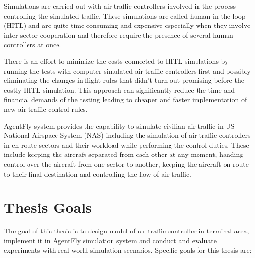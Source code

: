 Simulations are carried out with air traffic controllers involved in the process controlling the simulated traffic. These simulations are called human in the loop (HITL) and are quite time consuming and expensive especially when they involve inter-sector cooperation and therefore require the presence of several human controllers at once.

There is an effort to minimize the costs connected to HITL simulations by running the tests with computer simulated air traffic controllers first and possibly eliminating the changes in flight rules that didn't turn out promising before the costly HITL simulation. This approach can significantly reduce the time and financial demands of the testing leading to cheaper and faster implementation of new air traffic control rules.

AgentFly system provides the capability to simulate civilian air traffic in US National Airspace System (NAS) including the simulation of air traffic controllers in en-route sectors and their workload while performing the control duties. These include keeping the aircraft separated from each other at any moment, handing control over the aircraft from one sector to another, keeping the aircraft on route to their final destination and controlling the flow of air traffic.

\section{Thesis Goals}

The goal of this thesis is to design model of air traffic controller in terminal area, implement it in AgentFly simulation system and conduct and evaluate experiments with real-world simulation scenarios. Specific goals for this thesis are:

